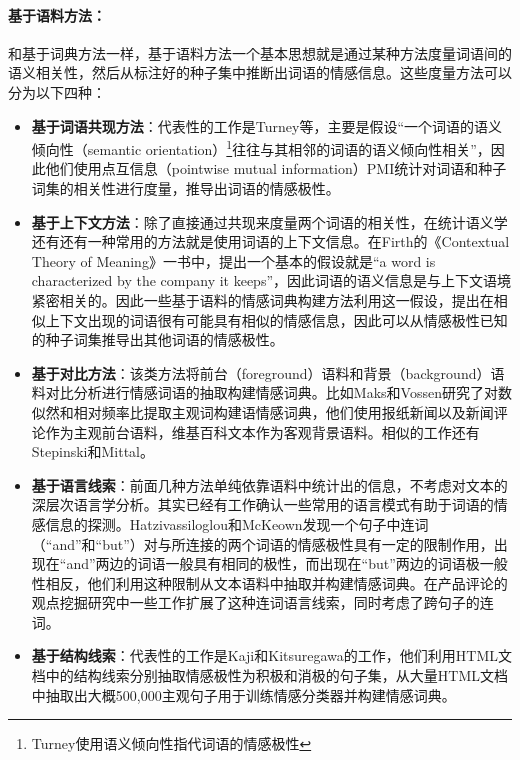 \paragraph{基于语料方法：}
和基于词典方法一样，基于语料方法一个基本思想就是通过某种方法度量词语间的语义相关性，然后从标注好的种子集中推断出词语的情感信息。这些度量方法可以分为以下四种：
\begin{itemize}
\item \textbf{基于词语共现方法}：代表性的工作是Turney等，主要是假设“一个词语的语义倾向性（semantic orientation）\footnote{Turney使用语义倾向性指代词语的情感极性}往往与其相邻的词语的语义倾向性相关”，因此他们使用点互信息（pointwise mutual information）PMI统计对词语和种子词集的相关性进行度量，推导出词语的情感极性。
\item \textbf{基于上下文方法}：除了直接通过共现来度量两个词语的相关性，在统计语义学还有还有一种常用的方法就是使用词语的上下文信息。在Firth的《Contextual Theory of Meaning》一书中，提出一个基本的假设就是“a word is characterized by the company it keeps”，因此词语的语义信息是与上下文语境紧密相关的。因此一些基于语料的情感词典构建方法利用这一假设，提出在相似上下文出现的词语很有可能具有相似的情感信息，因此可以从情感极性已知的种子词集推导出其他词语的情感极性。
\item \textbf{基于对比方法}：该类方法将前台（foreground）语料和背景（background）语料对比分析进行情感词语的抽取构建情感词典。比如Maks和Vossen研究了对数似然和相对频率比提取主观词构建语情感词典，他们使用报纸新闻以及新闻评论作为主观前台语料，维基百科文本作为客观背景语料。相似的工作还有Stepinski和Mittal。
\item \textbf{基于语言线索}：前面几种方法单纯依靠语料中统计出的信息，不考虑对文本的深层次语言学分析。其实已经有工作确认一些常用的语言模式有助于词语的情感信息的探测。Hatzivassiloglou和McKeown发现一个句子中连词（“and”和“but”）对与所连接的两个词语的情感极性具有一定的限制作用，出现在“and”两边的词语一般具有相同的极性，而出现在“but”两边的词语极一般性相反，他们利用这种限制从文本语料中抽取并构建情感词典。在产品评论的观点挖掘研究中一些工作扩展了这种连词语言线索，同时考虑了跨句子的连词。
\item \textbf{基于结构线索}：代表性的工作是Kaji和Kitsuregawa的工作，他们利用HTML文档中的结构线索分别抽取情感极性为积极和消极的句子集，从大量HTML文档中抽取出大概500,000主观句子用于训练情感分类器并构建情感词典。
\end{itemize}

